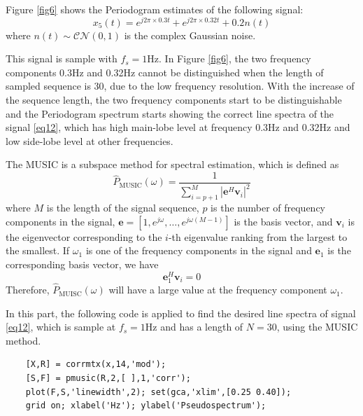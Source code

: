 \documentclass[10pt]{article}
\begin{document}
Figure \ref{fig6} shows the Periodogram estimates of the following signal:
\begin{equation}
	x_5\left(t\right)=e^{j2\pi\times0.3t}+e^{j2\pi\times0.32t}+0.2n\left(t\right) \label{eq12}
\end{equation} 
where $n\left(t\right) \sim \mathcal{CN}(0,1)$ is the complex Gaussian noise.


This signal is sample with $f_s=1$Hz. In Figure \ref{fig6}, the two frequency 
components 0.3Hz and 0.32Hz cannot be distinguished when the length of 
sampled sequence is 30, due to the low frequency resolution. With 
the increase of the sequence length, the two frequency components start to 
be distinguishable and the Periodogram spectrum starts showing the correct line 
spectra of the signal \eqref{eq12}, which has high main-lobe level at frequency 
0.3Hz and 0.32Hz and low side-lobe level at other frequencies.

The MUSIC is a subspace method for spectral estimation, which is defined as
\begin{equation}
	{\hat{P}}_{\text{MUSIC}}\left(\omega\right)=\frac{1}{\sum_{i=p+1}^{M}\left|\mathbf{e}^H\mathbf{v}_i\right|^2} \label{eq13}
\end{equation}
where $M$ is the length of the signal sequence, $p$ is the number of 
frequency components in the signal, $\mathbf{e}=\left[1,e^{j\omega},\ldots,e^{j\omega\left(M-1\right)}\right]$ is the 
basis vector, and $\mathbf{v}_i$ is the eigenvector corresponding to the 
$i$-th eigenvalue ranking from the largest to the smallest. If $\omega_1$ is 
one of the frequency components in the signal and $\mathbf{e}_1$ is the 
corresponding basis vector, we have
\begin{equation}
	\mathbf{e}_1^H\mathbf{v}_i=0 \label{eq14}
\end{equation}
Therefore, ${\hat{P}}_{\text{MUISC}}\left(\omega\right)$ will have a 
large value at the frequency component $\omega_1$.

In this part, the following code is applied to find the desired line 
spectra of signal \eqref{eq12}, which is sample at $f_s=1$Hz and has a 
length of $N=30$, using the MUSIC method. 

\begin{lstlisting}
	[X,R] = corrmtx(x,14,'mod');
	[S,F] = pmusic(R,2,[ ],1,'corr');
	plot(F,S,'linewidth',2); set(gca,'xlim',[0.25 0.40]);
	grid on; xlabel('Hz'); ylabel('Pseudospectrum');
\end{lstlisting}
\end{document}
